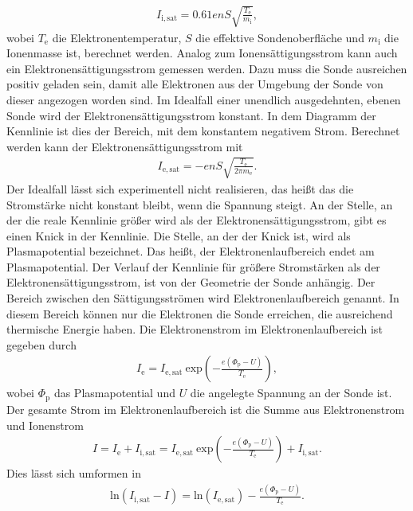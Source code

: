 \begin{align}
 I_{\mathrm{i},\mathrm{sat}}=0.61enS \sqrt{\frac{T_\mathrm{e}}{m_{\mathrm{i}}}},
\end{align} 
 wobei $T_{\mathrm{e}}$ die Elektronentemperatur, $S$ die effektive Sondenoberfläche und $m_{\mathrm{i}}$ die Ionenmasse ist, berechnet werden. Analog zum Ionensättigungsstrom kann auch ein Elektronensättigungsstrom gemessen werden. Dazu muss die Sonde ausreichen positiv geladen sein, damit alle Elektronen aus der Umgebung der Sonde von dieser angezogen worden sind. Im Idealfall einer unendlich ausgedehnten, ebenen Sonde wird der Elektronensättigungsstrom konstant. In dem Diagramm der Kennlinie ist dies der Bereich, mit dem konstantem negativem Strom. Berechnet werden kann der Elektronensättigungsstrom mit
\begin{align}
I_{\mathrm{e},\mathrm{sat}}=-enS \sqrt{\frac{T_{\mathrm{e}}}{2\pi m_{\mathrm{e}}}}.
\label{eq:Ionensaettigungsstrom}
\end{align}
Der Idealfall lässt sich experimentell nicht realisieren, das heißt das die Stromstärke nicht konstant bleibt, wenn die Spannung steigt. An der Stelle, an der die reale Kennlinie größer wird als der Elektronensättigungsstrom, gibt es einen Knick in der Kennlinie. Die Stelle, an der der Knick ist, wird als Plasmapotential bezeichnet. Das heißt, der Elektronenlaufbereich endet am Plasmapotential. Der Verlauf der Kennlinie für größere Stromstärken als der Elektronensättigungsstrom, ist von der Geometrie der Sonde anhängig. Der Bereich zwischen den Sättigungsströmen wird Elektronenlaufbereich genannt. In diesem Bereich können nur die Elektronen die Sonde erreichen, die  ausreichend thermische Energie haben. Die Elektronenstrom im Elektronenlaufbereich ist gegeben durch
\begin{align}
I_{\mathrm{e}}=I_{\mathrm{e},\mathrm{sat}}\ \mathrm{exp} \left( -\frac{e(\Phi_{\mathrm{p}}-U)}{T_{\mathrm{e}}} \right),
\label{eq:Elektronenlaufbereich}
\end{align}
wobei $\Phi_{\mathrm{p}}$ das Plasmapotential und $U$ die angelegte Spannung an der Sonde ist. Der gesamte Strom im Elektronenlaufbereich ist die Summe aus Elektronenstrom und Ionenstrom
\begin{align}
I=I_{\mathrm{e}} +  I_{\mathrm{i},\mathrm{sat}}=  I_{\mathrm{e},\mathrm{sat}}\ \mathrm{exp} \left( -\frac{e(\Phi_{\mathrm{p}}-U)}{T_{\mathrm{e}}} \right) + I_{\mathrm{i},\mathrm{sat}}.
\end{align}
Dies lässt sich umformen in
\begin{align}
\mathrm{ln}(I_{\mathrm{i},\mathrm{sat}} -I) = \mathrm{ln}(I_{\mathrm{e},\mathrm{sat}}) - \frac{e(\Phi_{\mathrm{p}}-U)}{T_{\mathrm{e}}}.
\end{align}
